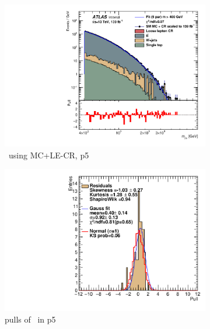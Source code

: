 \begin{figure}[H]
\begin{subfigure}[h]{0.38\linewidth}
    \includegraphics[scale=0.3]{figs/ch6/fit/variable_nosmooth/p5/10PB/output_SMMCplusCR_Mjm_p5.pdf}%
     \caption{\mjmu \ using MC+LE-CR, p5}
     \end{subfigure}
     \hfill
    \begin{subfigure}[h]{0.4\linewidth}
    \includegraphics[scale=0.32]{figs/ch6/fit/variable_nosmooth/p5/10PB/pull_SMMCplusCR_Mjm_p5.pdf}%
    \caption{pulls of \mjmu \ in p5}
    \end{subfigure}
    \hfill
    \begin{subfigure}[h]{0.38\linewidth}

\end{subfigure}
\end{figure}
